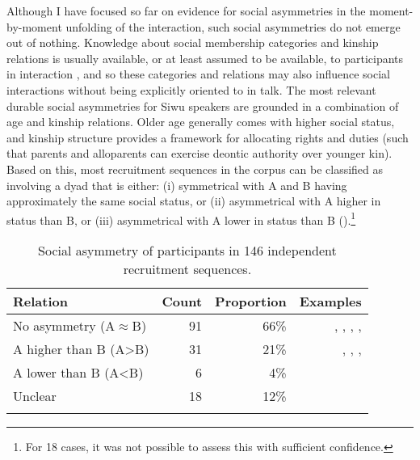 \documentclass[output=paper]{langsci/langscibook}
\begin{document}
Although I have focused so far on evidence for social asymmetries in the moment-by-moment unfolding of the interaction, such social asymmetries do not emerge out of nothing. Knowledge about social membership categories and kinship relations is usually available, or at least assumed to be available, to participants in interaction \citep{terkourafi_beyond_2005,enfield_relationship_2013}, and so these categories and relations may also influence social interactions without being explicitly oriented to in talk. The most relevant durable social asymmetries for Siwu speakers are grounded in a combination of age and kinship relations. Older age generally comes with higher social status, and kinship structure provides a framework for allocating rights and duties (such that parents and alloparents can exercise deontic authority over younger kin). Based on this, most recruitment sequences in the corpus can be classified as involving a dyad that is either: (i) symmetrical with A and B having approximately the same social status, or (ii) asymmetrical with A higher in status than B, or (iii) asymmetrical with A lower in status than B ().\footnote{For 18 cases, it was not possible to assess this with sufficient confidence.}

\begin{table}
\begin{tabularx}{\textwidth}{Qrrr}
\lsptoprule
Relation & Count & Proportion & Examples\\
\midrule
No asymmetry (A${\approx}$B) & 91 & 66\% & ,  ,  ,  ,  \\
A higher than B (A>B) & 31 & 21\% &  ,  ,  ,  \\
A lower than B (A<B) & 6 & 4\% &  \\
Unclear & 18 & 12\% & \\
\lspbottomrule
\end{tabularx}
\caption{Social asymmetry of participants in 146 independent recruitment sequences.}
\label{tab:dingemanse:7}
\end{table}
\end{document}
